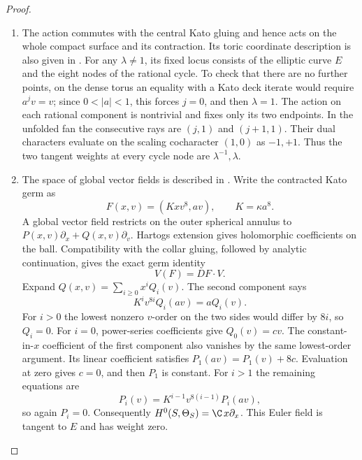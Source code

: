 \begin{proof}
\begin{enumerate}[label=\arabic*.,leftmargin=*]
\item The action commutes with the central Kato gluing and hence
acts on the whole compact surface and its contraction.
Its toric coordinate description is also given in
\citet[Section~2, equations~(1)--(8), p.~4]{Fujiki2009D}.
For any $\lambda\ne1$, its fixed locus consists of the elliptic
curve $E$ and the eight nodes of the rational cycle.
To check that there are no further points, on the dense torus
an equality with a Kato deck iterate would require $a^jv=v$;
since $0<|a|<1$, this forces $j=0$, and then $\lambda=1$.
The action on each rational component is nontrivial and fixes
only its two endpoints.  In the unfolded fan the consecutive
rays are $(j,1)$ and $(j+1,1)$.
Their dual characters evaluate on the scaling cocharacter
$(1,0)$ as $-1,+1$.
Thus the two tangent weights at every cycle node are
$\lambda^{-1},\lambda$.

\item The space of global vector fields is described in
\citet[Theorem~1.1, pp.~1--2]{Fujiki2009D}.
Write the contracted Kato germ as
\[
 F(x,v)=(Kxv^8,av),\qquad K=\kappa a^8.
\]
A global vector field restricts on the outer spherical annulus
to $P(x,v)\partial_x+Q(x,v)\partial_v$.
Hartogs extension gives holomorphic coefficients on the ball.
Compatibility with the collar gluing, followed by analytic
continuation, gives the exact germ identity
\[
 V(F)=DF\cdot V.
\]
Expand $Q(x,v)=\sum_{i\ge0}x^iQ_i(v)$.
The second component says
\[
 K^iv^{8i}Q_i(av)=aQ_i(v).
\]
For $i>0$ the lowest nonzero $v$-order on the two sides would
differ by $8i$, so $Q_i=0$.
For $i=0$, power-series coefficients give $Q_0(v)=cv$.
The constant-in-$x$ coefficient of the first component also
vanishes by the same lowest-order argument.
Its linear coefficient satisfies
$P_1(av)=P_1(v)+8c$.
Evaluation at zero gives $c=0$, and then $P_1$ is constant.
For $i>1$ the remaining equations are
\[
 P_i(v)=K^{i-1}v^{8(i-1)}P_i(av),
\]
so again $P_i=0$.
Consequently $H^0(S,\Theta_S)=\C\,x\partial_x$.
This Euler field is tangent to $E$ and has weight zero.


\end{enumerate}
\end{proof}
